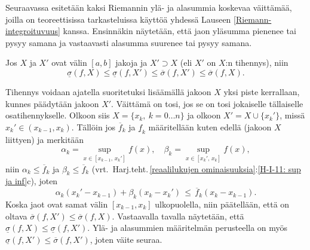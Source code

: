 Seuraavassa esitetään kaksi Riemannin ylä- ja alasummia koskevaa väittämää, joilla on
teoreettisissa tarkasteluissa käyttöä yhdessä Lauseen \ref{Riemann-integroituvuus} kanssa.
Ensinnäkin näytetään, että jaon
%
 yläsumma pienenee tai pysyy samana ja
vastaavasti alasumma suurenee tai pysyy samana.
\begin{Lause} \label{jaon tihennys} Jos $X$ ja $X'$ ovat välin $[a,b]$ jakoja ja $X' \supset X$ 
(eli $X'$ on $X$:n tihennys), niin
\[
\underline{\sigma}(f,X) \le \underline{\sigma}(f,X') \le
\overline{\sigma}(f,X') \le \overline{\sigma}(f,X).
\]
\end{Lause}
\tod Tihennys voidaan ajatella suoritetuksi lisäämällä jakoon $X$ yksi piste kerrallaan,
kunnes päädytään jakoon $X'$. Väittämä on tosi, jos se on tosi jokaiselle tällaiselle
osatihennykselle. Olkoon siis $X = \{x_k,\ k = 0 \ldots n\}$ ja olkoon $X'=X\cup\{x_k'\}$,
missä $x_k' \in (x_{k-1},x_k)$. Tällöin jos $\overline{f}_k$ ja $\underline{f}_k$ määritellään
kuten edellä (jakoon $X$ liittyen) ja merkitään
\[
\alpha_k = \sup_{x\in[x_{k-1},\,x_k']} f(x), \quad \beta_k = \sup_{x\in[x_k',\,x_k]} f(x),
\]
niin $\alpha_k \le \overline{f}_k$ ja $\beta_k \le \overline{f}_k$
(vrt.\ Harj.teht.\,\ref{reaalilukujen ominaisuuksia}:\ref{H-I-11: sup ja inf}c), joten
\[
\alpha_k(x_k'-x_{k-1})+\beta_k(x_k-x_k')\,\le\,\overline{f}_k(x_k-x_{k-1}).
\]
Koska jaot ovat samat välin $[x_{k-1},x_k]$ ulkopuolella, niin päätellään, että on oltava
$\overline{\sigma}(f,X') \le \overline{\sigma}(f,X)$. Vastaavalla tavalla näytetään, että
$\underline{\sigma}(f,X) \le \underline{\sigma}(f,X')$. Ylä- ja alasummien määritelmän 
perusteella on myös $\underline{\sigma}(f,X') \le \overline{\sigma}(f,X')$, joten väite 
seuraa. \loppu

